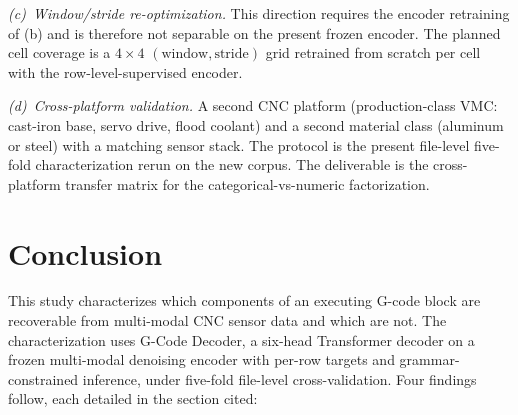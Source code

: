 \documentclass[sensors,article,submit,moreauthors,pdftex]{Definitions/mdpi}
\newcommand{\modelname}{G-Code Decoder}
\begin{document}
\emph{(c)~Window/stride re-optimization.} This direction requires the encoder retraining of (b) and is therefore not separable on the present frozen encoder. The planned cell coverage is a $4\!\times\!4$ $(\text{window}, \text{stride})$ grid retrained from scratch per cell with the row-level-supervised encoder.

\emph{(d)~Cross-platform validation.} A second CNC platform (production-class VMC: cast-iron base, servo drive, flood coolant) and a second material class (aluminum or steel) with a matching sensor stack. The protocol is the present file-level five-fold characterization rerun on the new corpus. The deliverable is the cross-platform transfer matrix for the categorical-vs-numeric factorization.

\section{Conclusion}
\label{sec:conclusion}

This study characterizes which components of an executing G-code block are recoverable from multi-modal CNC sensor data and which are not. The characterization uses \modelname{}, a six-head Transformer decoder on a frozen multi-modal denoising encoder with per-row targets and grammar-constrained inference, under five-fold file-level cross-validation. Four findings follow, each detailed in the section cited:
\end{document}
